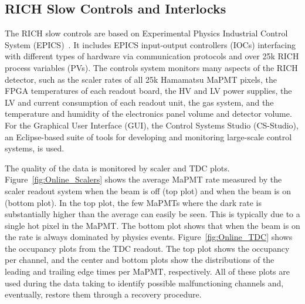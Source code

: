 \documentclass[5p,times,twocolumn]{elsarticle}
\begin{document}
\subsection{RICH Slow Controls and Interlocks}
\label{sec:SlowControl}

The RICH slow controls are based on Experimental Physics Industrial Control System (EPICS)~\cite{Ref:EPICS}. It
includes EPICS input-output controllers (IOCs) interfacing with different types of hardware via communication
protocols and over 25k RICH process variables (PVs). The controls system monitors many aspects of the RICH
detector, such as the scaler rates of all 25k Hamamatsu MaPMT pixels, the FPGA temperatures of each readout
board, the HV and LV power supplies, the LV and current consumption of each readout unit, the gas system, and
the temperature and humidity of the electronics panel volume and detector volume. For the Graphical User Interface
(GUI), the Control Systems Studio (CS-Studio), 
an Eclipse-based suite of tools for developing and monitoring large-scale control systems, is used. 
 

The quality of the data is monitored by scaler and TDC plots. Figure~\ref{fig:Online_Scalers} shows the average 
MaPMT rate measured by the scaler readout system when the beam is off (top plot) and when the beam is on
(bottom plot). In the top plot, the few MaPMTs where the dark rate is substantially higher than the
average can easily be seen. This is typically due to a single hot pixel in the MaPMT. 
The bottom plot shows that when the beam is on the rate is always dominated by physics
events. Figure~\ref{fig:Online_TDC} shows the occupancy plots from the TDC readout. The top plot shows the
occupancy per channel, and the center and bottom plots show the distributions of the leading and trailing edge times
per MaPMT, respectively. All of these plots are used during the data taking to identify possible malfunctioning channels
and, eventually, restore them through a recovery procedure.
\end{document}

